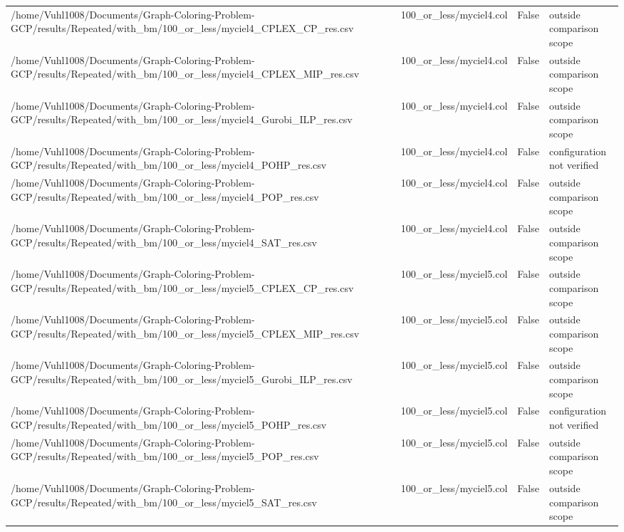 \begin{table}[htbp]
\begin{tabular}{llll}
/home/Vuhl1008/Documents/Graph-Coloring-Problem-GCP/results/Repeated/with\_bm/100\_or\_less/myciel4\_CPLEX\_CP\_res.csv & 100\_or\_less/myciel4.col & False & outside comparison scope \\
/home/Vuhl1008/Documents/Graph-Coloring-Problem-GCP/results/Repeated/with\_bm/100\_or\_less/myciel4\_CPLEX\_MIP\_res.csv & 100\_or\_less/myciel4.col & False & outside comparison scope \\
/home/Vuhl1008/Documents/Graph-Coloring-Problem-GCP/results/Repeated/with\_bm/100\_or\_less/myciel4\_Gurobi\_ILP\_res.csv & 100\_or\_less/myciel4.col & False & outside comparison scope \\
/home/Vuhl1008/Documents/Graph-Coloring-Problem-GCP/results/Repeated/with\_bm/100\_or\_less/myciel4\_POHP\_res.csv & 100\_or\_less/myciel4.col & False & configuration not verified \\
/home/Vuhl1008/Documents/Graph-Coloring-Problem-GCP/results/Repeated/with\_bm/100\_or\_less/myciel4\_POP\_res.csv & 100\_or\_less/myciel4.col & False & outside comparison scope \\
/home/Vuhl1008/Documents/Graph-Coloring-Problem-GCP/results/Repeated/with\_bm/100\_or\_less/myciel4\_SAT\_res.csv & 100\_or\_less/myciel4.col & False & outside comparison scope \\
/home/Vuhl1008/Documents/Graph-Coloring-Problem-GCP/results/Repeated/with\_bm/100\_or\_less/myciel5\_CPLEX\_CP\_res.csv & 100\_or\_less/myciel5.col & False & outside comparison scope \\
/home/Vuhl1008/Documents/Graph-Coloring-Problem-GCP/results/Repeated/with\_bm/100\_or\_less/myciel5\_CPLEX\_MIP\_res.csv & 100\_or\_less/myciel5.col & False & outside comparison scope \\
/home/Vuhl1008/Documents/Graph-Coloring-Problem-GCP/results/Repeated/with\_bm/100\_or\_less/myciel5\_Gurobi\_ILP\_res.csv & 100\_or\_less/myciel5.col & False & outside comparison scope \\
/home/Vuhl1008/Documents/Graph-Coloring-Problem-GCP/results/Repeated/with\_bm/100\_or\_less/myciel5\_POHP\_res.csv & 100\_or\_less/myciel5.col & False & configuration not verified \\
/home/Vuhl1008/Documents/Graph-Coloring-Problem-GCP/results/Repeated/with\_bm/100\_or\_less/myciel5\_POP\_res.csv & 100\_or\_less/myciel5.col & False & outside comparison scope \\
/home/Vuhl1008/Documents/Graph-Coloring-Problem-GCP/results/Repeated/with\_bm/100\_or\_less/myciel5\_SAT\_res.csv & 100\_or\_less/myciel5.col & False & outside comparison scope \\

\end{tabular}
\end{table}
